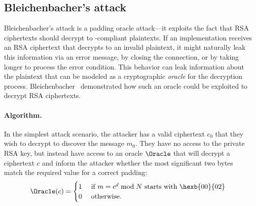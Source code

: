 \subsection{Bleichenbacher's attack}
\label{sec:bleichenbacher}
Bleichenbacher's attack is a padding oracle attack---it exploits the
fact that RSA ciphertexts should decrypt to \PKCS-compliant plaintexts.
If an implementation receives an RSA
ciphertext that decrypts to an invalid \PKCS plaintext, it might
naturally leak this information via an error message, by closing the
connection, or by taking longer to process the error condition.  This
behavior can leak information about the plaintext that can be modeled
as a cryptographic \textit{oracle} for the decryption
process. Bleichenbacher~\cite{Bleichenbacher} demonstrated how such an
oracle could be exploited to decrypt RSA ciphertexts.


\paragraph{Algorithm.}
In the simplest attack scenario, the attacker has a valid \PKCS
ciphertext $c_{0}$ that they wish to decrypt to discover the message
$m_{0}$.  They have no access to the private RSA key, but instead have
access to an oracle $\Oracle$ that will decrypt a ciphertext $c$ and
inform the attacker whether the most significant two bytes match
the required value for a correct \PKCS padding:
\begin{equation*} 
\Oracle(c) =  
\begin{cases} 
1 & \text{ if } m=c^d \bmod N \text{ starts with \hexb{00}{02}} \\ 
0 & \text{ otherwise.} 
\end{cases} 
\end{equation*} 

